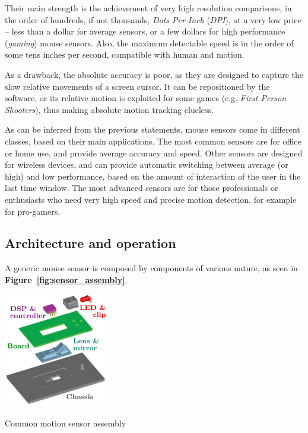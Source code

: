 \documentclass[a4paper,10pt]{article}
\makeatletter
\newenvironment{figurehere}{\def\@captype{figure}\vspace{2ex}}{\vspace{2ex}}
\makeatother
\begin{document}
\begin{multicols}{2}
Their main strength is the achievement of very high resolution comparisons, in
the order of hundreds, if not thousands, \emph{Dots Per Inch} (\emph{DPI}), at
a very low price -- less than a dollar for average sensors, or a few dollars
for high performance (\emph{gaming}) mouse sensors. Also, the maximum
detectable speed is in the order of some tens inches per second, compatible
with human and motion.

As a drawback, the absolute accuracy is poor, as they are designed to capture
the slow relative movements of a screen cursor. It can be repositioned by
the software, or its relative motion is exploited for some games (e.g.
\emph{First Person Shooters}), thus making absolute motion tracking clueless.

As can be inferred from the previous statements, mouse sensors come in
different classes, based on their main applications. The most common sensors
are for office or home use, and provide average accuracy and speed. Other
sensors are designed for wireless devices, and can provide automatic switching
between average (or high) and low performance, based on the amount of
interaction of the user in the last time window. The most advanced sensors are
for those professionals or enthusiasts who need very high speed and precise
motion detection, for example for pro-gamers.


\subsection{Architecture and operation}

A generic mouse sensor is composed by components of various nature, as seen
in \textbf{Figure~\ref{fig:sensor_assembly}}.

\begin{figurehere}
	\label{fig:sensor_assembly}
	\centering
	\includegraphics[keepaspectratio=true,height=5cm]{images/sensor_assembly.pdf}
	\caption{Common motion sensor assembly}
\end{figurehere}



\end{multicols}
\end{document}
